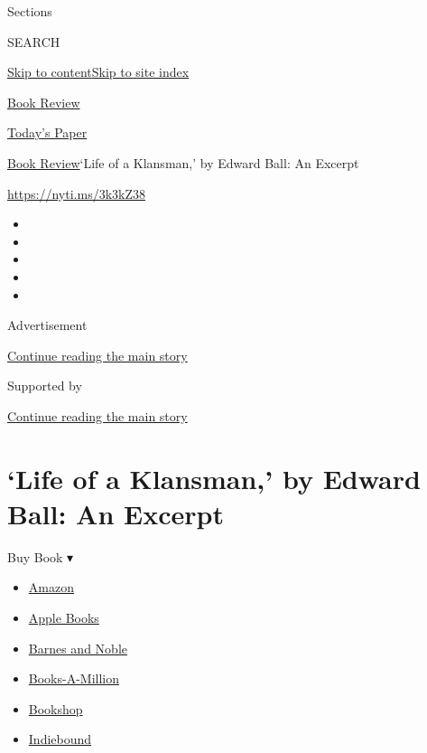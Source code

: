 Sections

SEARCH

\protect\hyperlink{site-content}{Skip to
content}\protect\hyperlink{site-index}{Skip to site index}

\href{https://www.nytimes3xbfgragh.onion/section/books/review}{Book
Review}

\href{https://myaccount.nytimes3xbfgragh.onion/auth/login?response_type=cookie\&client_id=vi}{}

\href{https://www.nytimes3xbfgragh.onion/section/todayspaper}{Today's
Paper}

\href{/section/books/review}{Book Review}\textbar{}`Life of a Klansman,'
by Edward Ball: An Excerpt

\url{https://nyti.ms/3k3kZ38}

\begin{itemize}
\item
\item
\item
\item
\item
\end{itemize}

Advertisement

\protect\hyperlink{after-top}{Continue reading the main story}

Supported by

\protect\hyperlink{after-sponsor}{Continue reading the main story}

\hypertarget{life-of-a-klansman-by-edward-ball-an-excerpt}{%
\section{`Life of a Klansman,' by Edward Ball: An
Excerpt}\label{life-of-a-klansman-by-edward-ball-an-excerpt}}

Buy Book ▾

\begin{itemize}
\tightlist
\item
  \href{https://www.amazon.com/gp/search?index=books\&tag=NYTBSREV-20\&field-keywords=Life+of+a+Klansman\%3A+A+Family+History+in+White+Supremacy+Edward+Ball}{Amazon}
\item
  \href{https://du-gae-books-dot-nyt-du-prd.appspot.com/buy?title=Life+of+a+Klansman\%3A+A+Family+History+in+White+Supremacy\&author=Edward+Ball}{Apple
  Books}
\item
  \href{https://www.anrdoezrs.net/click-7990613-11819508?url=https\%3A\%2F\%2Fwww.barnesandnoble.com\%2Fw\%2F\%3Fean\%3D9780374186326}{Barnes
  and Noble}
\item
  \href{https://www.anrdoezrs.net/click-7990613-35140?url=https\%3A\%2F\%2Fwww.booksamillion.com\%2Fp\%2FLife\%2Bof\%2Ba\%2BKlansman\%253A\%2BA\%2BFamily\%2BHistory\%2Bin\%2BWhite\%2BSupremacy\%2FEdward\%2BBall\%2F9780374186326}{Books-A-Million}
\item
  \href{https://bookshop.org/a/3546/9780374186326}{Bookshop}
\item
  \href{https://www.indiebound.org/book/9780374186326?aff=NYT}{Indiebound}
\end{itemize}


